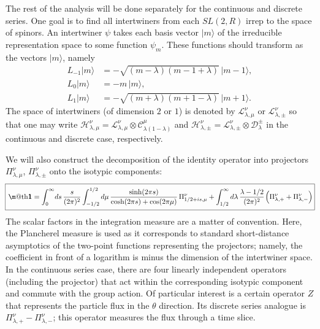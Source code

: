 \documentclass[11pt]{article}
\makeatletter
\newcommand*{\wideboxed}[1]{\setlength{\fboxsep}{1ex}%
  \fbox{\m@th$\displaystyle#1$}}
\newcommand*{\ket}[1]{|{#1}\rangle}
\newcommand{\calC}{\mathcal{C}}
\newcommand{\calD}{\mathcal{D}}
\newcommand{\calH}{\mathcal{H}}
\newcommand{\calL}{\mathcal{L}}
\newcommand{\RR}{\mathbb{R}}
\newcommand{\CC}{\mathbb{C}}
\DeclareMathOperator{\SL}{SL}
\newcommand{\unit}{\mathbf{1}}
\newcommand{\lam}{\lambda}
\newcommand{\ov}{\over}
\def\widetilde#1{#1}%
\def\SL{SL}
\def\RR{R}
\makeatother
\begin{document}
The rest of the analysis will be done separately for the continuous and discrete series. One goal is to find all intertwiners from each $\widetilde{\SL}(2,\RR)$ irrep to the space of spinors. An intertwiner $\psi$ takes each basis vector $\ket{m}$ of the irreducible representation space to some function $\psi_m$. These functions should transform as the vectors $\ket{m}$, namely
\begin{equation}\label{bvtrans}
\begin{aligned}
L_{-1}\ket{m}&=-\sqrt{(m-\lambda)(m-1+\lambda)}\,\ket{m-1},\\[3pt]
L_0\ket{m}&=-m\,\ket{m},\\[3pt]
L_1\ket{m}&=-\sqrt{(m+\lambda)(m+1-\lambda)}\,\ket{m+1}.
\end{aligned}
\end{equation}
The space of intertwiners (of dimension $2$ or $1$) is denoted by $\calL^{\nu}_{\lambda,\mu}$ or $\calL^{\nu}_{\lambda,\pm}$ so that one may write $\calH^{\nu}_{\lambda,\mu}= \calL^{\nu}_{\lambda,\mu}\otimes\calC_{\lambda(1-\lambda)}^{\mu}$ and $\calH^{\nu}_{\lambda,\pm}= \calL^{\nu}_{\lambda,\pm}\otimes\calD_{\lambda}^{\pm}$ in the continuous and discrete case, respectively.

We will also construct the decomposition of the identity operator into projectors $\Pi^{\nu}_{\lambda,\mu}$, $\Pi^{\nu}_{\lambda,\pm}$ onto the isotypic components:
\begin{equation}
\!\wideboxed{
\unit=\int_{0}^{\infty}\!ds\,{s \ov (2\pi)^2}
\int_{-1/2}^{1/2}d\mu\, \frac{\sinh(2\pi s)}{\cosh(2\pi s)+\cos(2\pi\mu)}\,
\Pi^{\nu}_{1/2+is,\mu}
+\int_{1/2}^{\infty}d\lam\,\frac{\lambda-1/2}{(2\pi)^2}\kern1pt
\Bigl(\Pi_{\lambda,+}^{\nu}+\Pi_{\lambda,-}^{\nu}\Bigr)\!
}\!
\end{equation}
The scalar factors in the integration measure are a matter of convention. Here, the Plancherel measure is used as it corresponds to standard short-distance asymptotics of the two-point functions representing the projectors; namely, the coefficient in front of a logarithm is minus the dimension of the intertwiner space. In the continuous series case, there are four linearly independent operators (including the projector) that act within the corresponding isotypic component and commute with the group action. Of particular interest is a certain operator $Z$ that represents the particle flux in the $\theta$ direction. Its discrete series analogue is $\Pi_{\lambda,+}^{\nu}-\Pi_{\lambda,-}^{\nu}$; this operator measures the flux through a time slice.
\end{document}
